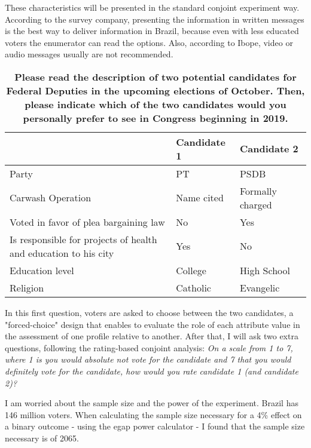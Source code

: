 \documentclass[12pt,a4paper]{article}
\begin{document}
    
These characteristics will be presented in the standard conjoint experiment way. According to the survey company, presenting the information in written messages is the best way to deliver information in Brazil, because even with less educated voters the enumerator can read the options. Also, according to Ibope, video or audio messages usually are not recommended.  

\begin{table}[]
\centering
\caption{\textbf{Please read the description of two potential candidates for Federal Deputies in the upcoming elections of October. Then, please indicate which of the two candidates would you personally prefer to see in Congress beginning in 2019.}}
\label{my-label}
\begin{tabular}{|l|l|l|}
\hline
                                                                & Candidate 1 & Candidate 2 \\ \hline
Party                                                           & PT          & PSDB        \\ \hline
Carwash Operation                                           & Name cited         &  Formally charged          \\ \hline
Voted in favor of plea bargaining law                           & No          & Yes         \\ \hline
Is responsible for projects of health and education to his city & Yes         & No          \\ \hline
Education level                                                 & College     & High School \\ \hline
Religion                                                        & Catholic    & Evangelic   \\ \hline

\end{tabular}
\end{table}


In this first question, voters are asked to choose between the two candidates, a "forced-choice" design that enables to evaluate the role of each attribute value in the assessment of one profile relative to another. After that, I will ask two extra questions, following the rating-based conjoint analysis: \textit{On a scale from 1 to 7, where 1 is you would absolute not vote for the candidate and 7 that you would definitely vote for the candidate, how would you rate candidate 1 (and candidate 2)? 
} 


I am worried about the sample size and the power of the experiment. Brazil has 146 million voters. When calculating the sample size necessary for a 4\% effect on a binary outcome - using the egap power calculator - I found that the sample size necessary is of 2065. 
\end{document}
